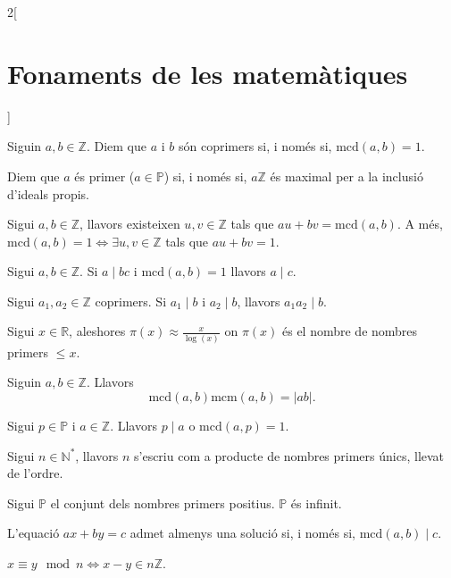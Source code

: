 \documentclass[../../../main.tex]{subfiles}
\begin{document}
\begin{multicols}{2}[\section{Fonaments de les matemàtiques}]
\begin{prop}
\end{prop}
\begin{definition}
Siguin $a,b\in\mathbb{Z}$. Diem que $a$ i $b$ són coprimers si, i només si, $\text{mcd}(a,b)=1$.
\end{definition}
\begin{definition}
Diem que $a$ és primer ($a\in\mathbb{P}$) si, i només si, $a\mathbb{Z}$ és maximal per a la inclusió d'ideals propis.
\end{definition}
\begin{theorem}
Sigui $a,b\in\mathbb{Z}$, llavors existeixen $u,v\in\mathbb{Z}$ tals que $au+bv=\text{mcd}(a,b)$. A més, $\text{mcd}(a,b)=1\iff\exists u,v\in\mathbb{Z}$ tals que $au+bv=1$.
\end{theorem}
\begin{theorem}
Sigui $a,b\in\mathbb{Z}$. Si $a\mid bc$ i $\text{mcd}(a,b)=1$ llavors $a\mid c$.
\end{theorem}
\begin{corollary}
Sigui $a_1,a_2\in\mathbb{Z}$ coprimers. Si $a_1\mid b$ i $a_2\mid b$, llavors $a_1a_2\mid b$.
\end{corollary}
\begin{theorem}
Sigui $x\in\mathbb{R}$, aleshores $\pi(x)\approx\frac{x}{\log(x)}$ on $\pi(x)$ és el nombre de nombres primers $\leq x$.
\end{theorem}
\begin{theorem}
Siguin $a,b\in\mathbb{Z}$. Llavors $$\text{mcd}(a,b)\text{mcm}(a,b)=|ab|.$$
\end{theorem}
\begin{lemma}
Sigui $p\in\mathbb{P}$ i $a\in\mathbb{Z}$. Llavors $p\mid a$ o $\text{mcd}(a,p)=1$.
\end{lemma}
\begin{theorem}
Sigui $n\in\mathbb{N}^*$, llavors $n$ s'escriu com a producte de nombres primers únics, llevat de l'ordre.
\end{theorem}
\begin{theorem}
Sigui $\mathbb{P}$ el conjunt dels nombres primers positius. $\mathbb{P}$ és infinit. 
\end{theorem}
\begin{theorem}
L'equació $ax+by=c$ admet almenys una solució si, i només si, $\text{mcd}(a,b)\mid c$.
\end{theorem}
\begin{definition}
$x\equiv y\mod n\iff x-y\in n\mathbb{Z}$.

\end{definition}
\end{multicols}
\end{document}
